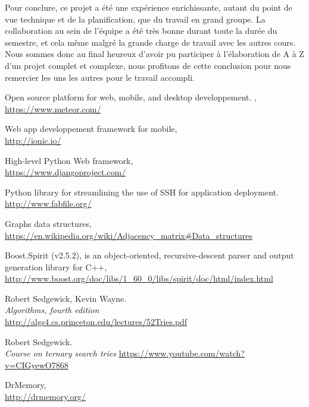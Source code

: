 \documentclass[french]{article}
\begin{document}
		Pour conclure, ce projet a été une expérience enrichissante, autant du point de vue technique et de la planification, que du travail en grand groupe. La collaboration au sein de l'équipe a été très bonne durant toute la durée du semestre, et cela même malgré la grande charge de travail avec les autres cours. Nous sommes donc au final heureux d'avoir pu participer à l'élaboration de A à Z d'un projet complet et complexe, nous profitons de cette conclusion pour nous remercier les uns les autres pour le travail accompli.
		
		\newpage
	
	\newpage
	

			
	
	\listoffigures
			
	\begin{thebibliography}{9}
		Open source platform for web, mobile, and desktop developpement. ,\\ \url{https://www.meteor.com/}
		
		Web app developpement framework for mobile,\\ \url{http://ionic.io/}
		
		High-level Python Web framework, \\ \url{https://www.djangoproject.com/}
		
		Python library for streamlining the use of SSH for application deployment.\\ \url{http://www.fabfile.org/}
		
		Graphs data structures,\\ \url{https://en.wikipedia.org/wiki/Adjacency_matrix#Data_structures}
		
		Boost.Spirit (v2.5.2), is an object-oriented, recursive-descent parser and output generation library for C++,\\ \url{http://www.boost.org/doc/libs/1_60_0/libs/spirit/doc/html/index.html}
		
		Robert Sedgewick, Kevin Wayne.\\
		\emph{Algorithms, fourth edition}\\
		\url{http://algs4.cs.princeton.edu/lectures/52Tries.pdf}
		
		Robert Sedgewick.\\
		\emph{Course on ternary search tries}
		\url{https://www.youtube.com/watch?v=CIGyewO7868}
		
		DrMemory,\\
		\url{http://drmemory.org/}
	\end{thebibliography}
			
\end{document}
